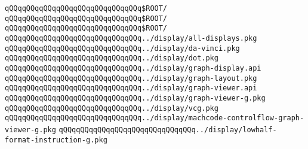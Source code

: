 \verb|qQQqqQQqqQQqqQQqqQQqqQQqqQQqqQQq$ROOT/|\newline
\verb|qQQqqQQqqQQqqQQqqQQqqQQqqQQqqQQq$ROOT/|\newline
\verb|qQQqqQQqqQQqqQQqqQQqqQQqqQQqqQQq$ROOT/|\newline
\newline
\verb|qQQqqQQqqQQqqQQqqQQqqQQqqQQqqQQq../display/all-displays.pkg|\newline
\verb|qQQqqQQqqQQqqQQqqQQqqQQqqQQqqQQq../display/da-vinci.pkg|\newline
\verb|qQQqqQQqqQQqqQQqqQQqqQQqqQQqqQQq../display/dot.pkg|\newline
\verb|qQQqqQQqqQQqqQQqqQQqqQQqqQQqqQQq../display/graph-display.api|\newline
\verb|qQQqqQQqqQQqqQQqqQQqqQQqqQQqqQQq../display/graph-layout.pkg|\newline
\verb|qQQqqQQqqQQqqQQqqQQqqQQqqQQqqQQq../display/graph-viewer.api|\newline
\verb|qQQqqQQqqQQqqQQqqQQqqQQqqQQqqQQq../display/graph-viewer-g.pkg|\newline
\verb|qQQqqQQqqQQqqQQqqQQqqQQqqQQqqQQq../display/vcg.pkg|\newline
\verb|qQQqqQQqqQQqqQQqqQQqqQQqqQQqqQQq../display/machcode-controlflow-graph-viewer-g.pkg|\newline
\verb|qQQqqQQqqQQqqQQqqQQqqQQqqQQqqQQq../display/lowhalf-format-instruction-g.pkg|\newline
\newline

